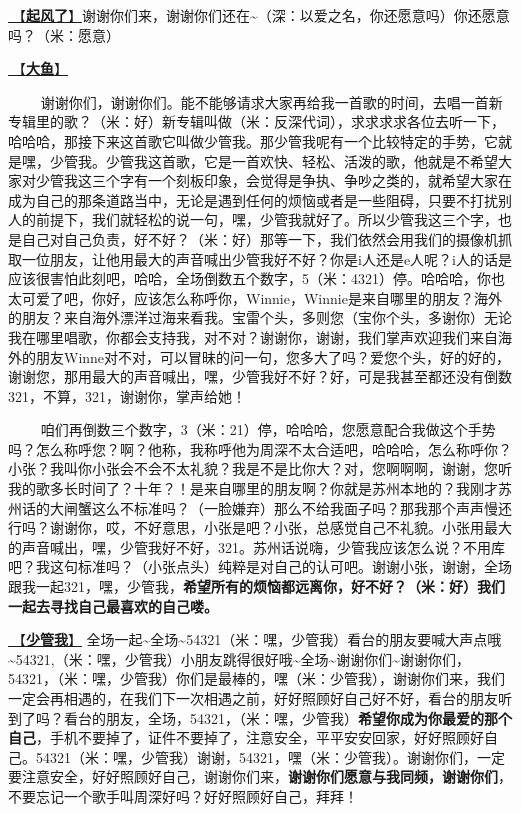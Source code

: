 \documentclass[]{ctexbook}
\begin{document}
\hyperref[the-wind-rises]{🎵【\textbf{起风了}】}谢谢你们来，谢谢你们还在\textasciitilde（深：以爱之名，你还愿意吗）你还愿意吗？（米：愿意）

\hyperref[big-fish]{🎵【\textbf{大鱼}】}

   谢谢你们，谢谢你们。能不能够请求大家再给我一首歌的时间，去唱一首新专辑里的歌？（米：好）新专辑叫做（米：反深代词），求求求求各位去听一下，哈哈哈，那接下来这首歌它叫做少管我。那少管我呢有一个比较特定的手势，它就是嘿，少管我。少管我这首歌，它是一首欢快、轻松、活泼的歌，他就是不希望大家对少管我这三个字有一个刻板印象，会觉得是争执、争吵之类的，就希望大家在成为自己的那条道路当中，无论是遇到任何的烦恼或者是一些阻碍，只要不打扰别人的前提下，我们就轻松的说一句，嘿，少管我就好了。所以少管我这三个字，也是自己对自己负责，好不好？（米：好）那等一下，我们依然会用我们的摄像机抓取一位朋友，让他用最大的声音喊出少管我好不好？你是i人还是e人呢？i人的话是应该很害怕此刻吧，哈哈，全场倒数五个数字，5（米：4321）停。哈哈哈，你也太可爱了吧，你好，应该怎么称呼你，Winnie，Winnie是来自哪里的朋友？海外的朋友？来自海外漂洋过海来看我。宝雷个头，多则您（宝你个头，多谢你）无论我在哪里唱歌，你都会支持我，对不对？谢谢你，谢谢，我们掌声欢迎我们来自海外的朋友Winne对不对，可以冒昧的问一句，您多大了吗？爱您个头，好的好的，谢谢您，那用最大的声音喊出，嘿，少管我好不好？好，可是我甚至都还没有倒数321，不算，321，谢谢你，掌声给她！

   咱们再倒数三个数字，3（米：21）停，哈哈哈，您愿意配合我做这个手势吗？怎么称呼您？啊？他称，我称呼他为周深不太合适吧，哈哈哈，怎么称呼你？小张？我叫你小张会不会不太礼貌？我是不是比你大？对，您啊啊啊，谢谢，您听我的歌多长时间了？十年？！是来自哪里的朋友啊？你就是苏州本地的？我刚才苏州话的大闸蟹这么不标准吗？（一脸嫌弃）那么不给我面子吗？那我那个声声慢还行吗？谢谢你，哎，不好意思，小张是吧？小张，总感觉自己不礼貌。小张用最大的声音喊出，嘿，少管我好不好，321。苏州话说嗨，少管我应该怎么说？不用库吧？我这句标准吗？（小张点头）纯粹是对自己的认可吧。谢谢小张，谢谢，全场跟我一起321，嘿，少管我，\textbf{希望所有的烦恼都远离你，好不好？（米：好）我们一起去寻找自己最喜欢的自己喽。}

\hyperref[watch-ur-manners]{🎵【\textbf{少管我}】} 全场一起\textasciitilde 全场\textasciitilde54321（米：嘿，少管我）看台的朋友要喊大声点哦\textasciitilde54321,（米：嘿，少管我）小朋友跳得很好哦\textasciitilde 全场\textasciitilde 谢谢你们\textasciitilde 谢谢你们，54321，（米：嘿，少管我）你们是最棒的，嘿（米：少管我），谢谢你们来，我们一定会再相遇的，在我们下一次相遇之前，好好照顾好自己好不好，看台的朋友听到了吗？看台的朋友，全场，54321，（米：嘿，少管我）\textbf{希望你成为你最爱的那个自己}，手机不要掉了，证件不要掉了，注意安全，平平安安回家，好好照顾好自己。54321（米：嘿，少管我）谢谢，54321，嘿（米：少管我）。谢谢你们，一定要注意安全，好好照顾好自己，谢谢你们来，\textbf{谢谢你们愿意与我同频，谢谢你们}，不要忘记一个歌手叫周深好吗？好好照顾好自己，拜拜！
\end{document}
